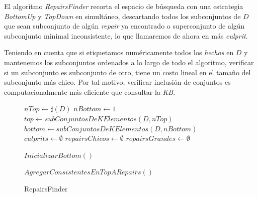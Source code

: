 \documentclass[11pt,a4paper,twoside]{tesis}
\begin{document}
El algoritmo \textit{RepairsFinder} recorta el espacio de búsqueda con una estrategia \textit{BottomUp} y \textit{TopDown} en simultáneo, descartando todos los subconjuntos de $D$ que sean subconjunto de algún \textit{repair} ya encontrado o superconjunto de algún subconjunto minimal inconsistente, lo que llamaremos de ahora en más \textit{culprit}. 

Teniendo en cuenta que si etiquetamos numéricamente todos los \textit{hechos} en $D$ y mantenemos los subconjuntos ordenados a lo largo de todo el algoritmo, verificar si un subconjunto es subconjunto de otro, tiene un costo lineal en el tamaño del subconjunto más chico. Por tal motivo, verificar inclusión de conjuntos es computacionalmente más eficiente que consultar la \textit{KB}. 

\begin{figure}
\begin{algorithm}[H]
\SetAlgoLined
$nTop \gets \sharp(D)$\;
$nBottom \gets 1$\;
$top \gets subConjuntosDeKElementos(D, nTop)$\;
$bottom \gets subConjuntosDeKElementos(D, nBottom)$\;
$culprits \gets \emptyset$\;
$repairsChicos \gets \emptyset$\;
$repairsGrandes \gets \emptyset$\;

$InicializarBottom()$\;


{
$AgregarConsistentesEnTopARepairs()$\;
}
 \caption{RepairsFinder}
\end{algorithm}
\end{figure}
\end{document}
